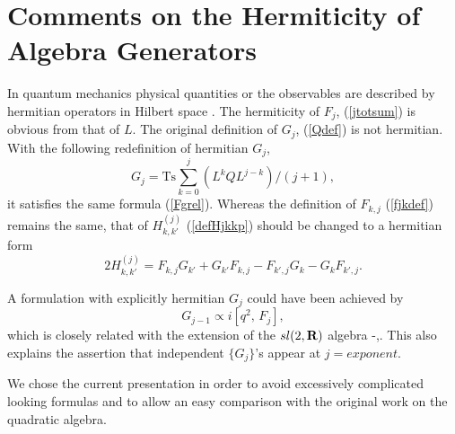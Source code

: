 \documentclass[a4paper,12pt]{article}
\begin{document}
\section{Comments on the Hermiticity of Algebra Generators}
\label{comm}
\setcounter{equation}{0}
In quantum mechanics physical quantities or the observables are
described by hermitian operators in Hilbert space \cite{Gonera1}.
The hermiticity of $F_j$, (\ref{jtotsum}) is obvious from that of $L$.
The original definition of $G_j$, (\ref{Qdef}) is not hermitian.
With the following redefinition of hermitian $G_j$,
\begin{equation}
G_j=\mbox{Ts}\sum_{k=0}^j(L^kQL^{j-k})/(j+1),
\end{equation}
it satisfies the same formula (\ref{Fgrel}).
Whereas the definition of $F_{k,j}$ (\ref{fjkdef}) remains the same,
that of  $H_{k,k'}^{(j)}$ (\ref{defHjkkp}) should be changed to
a hermitian form
\begin{equation}
2H_{k,k'}^{(j)}=F_{k,j}G_{k'}+G_{k'}F_{k,j}-
F_{k',j}G_{k}-G_{k}F_{k',j}.\label{newdefHjkkp}
\end{equation}

A formulation with  explicitly hermitian $G_j$ could have been achieved by
\begin{equation}
G_{j-1}\propto i[q^2,\,F_j],
\end{equation}
which is closely related with the extension of the $sl(2,{\bf R})$ algebra
\cite{Pere1}-\cite{Br},\cite{UjWa,Heck,Gonera1}. This also explains the
assertion that independent $\{G_j\}$'s appear at $j=exponent$.

We chose the current presentation in order to avoid excessively
complicated looking formulas and to allow
an easy comparison with the original work \cite{Kuz} on the quadratic
algebra.
\end{document}
